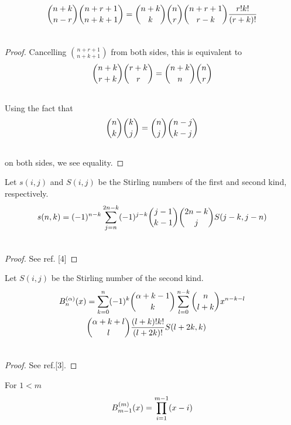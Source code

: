 \documentclass[fleqn,a4paper,9pt]{article}
\begin{document}
\begin{flushleft}
\begin{lemma}\label{bidentity}
\begin{align}
\binom{n+k}{n-r}\binom{n+r+1}{n+k+1}&=\binom{n+k}{k}\binom{n}{r}\binom{n+r+1}{r-k}\frac{r!k!}{(r+k)!}\\\notag
\end{align}
\end{lemma}
\begin{proof}
Cancelling $\binom{n+r+1}{n+k+1}$ from both sides, this is equivalent to
\begin{align}
\binom{n+k}{r+k}\binom{r+k}{r}&=\binom{n+k}{n}\binom{n}{r}\\\notag
\end{align}
Using the fact that
\begin{align}
\binom{n}{k}\binom{k}{j}&=\binom{n}{j}\binom{n-j}{k-j}\\\notag
\end{align}
on both sides, we see equality.
\end{proof}
\begin{lemma}\label{sS}
Let $s(i,j)$ and $S(i,j)$ be the Stirling numbers of the first and second kind, respectively.
\begin{align}
s(n,k)&=(-1)^{n-k}\sum_{j=n}^{2n-k}(-1)^{j-k}\binom{j-1}{k-1}\binom{2n-k}{j}S(j-k,j-n)\\\notag
\end{align}
\end{lemma}
\begin{proof}
See ref. [4]
\end{proof}
\begin{proposition}\label{BigB}
Let $S(i,j)$ be the Stirling number of the second kind.
\begin{align}
B_n^{(\alpha)}(x)&=\sum_{k=0}^n (-1)^k\binom{\alpha+k-1}{k}\sum_{l=0}^{n-k}\binom{n}{l+k}x^{n-k-l}\\\notag
&\binom{\alpha+k+l}{l}\frac{(l+k)!k!}{(l+2k)!}S(l+2k,k)\\\notag
\end{align}
\end{proposition}
\begin{proof}
See ref.[3].
\end{proof}
\begin{proposition}\label{prodOfZeros}
For $1<m$
\begin{align}
B_{m-1}^{(m)}(x)&=\prod_{i=1}^{m-1}(x-i)\\\notag
\end{align}
\end{proposition}

\end{flushleft}
\end{document}
